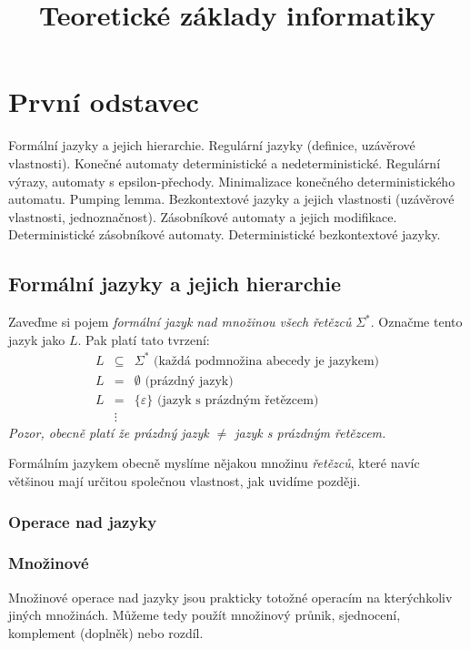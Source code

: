 \documentclass[10pt,a4paper]{article}
\title{Teoretické základy informatiky}
\theoremstyle{note}
\begin{document}
\maketitle

\newpage
\tableofcontents


\newpage

\section{První odstavec}

Formální jazyky a jejich hierarchie. Regulární jazyky (definice, uzávěrové vlastnosti). Konečné automaty deterministické
a nedeterministické. Regulární výrazy, automaty s epsilon-přechody. Minimalizace konečného deterministického
automatu. Pumping lemma. Bezkontextové jazyky a jejich vlastnosti (uzávěrové vlastnosti, jednoznačnost).
Zásobníkové automaty a jejich modifikace. Deterministické zásobníkové automaty. Deterministické
bezkontextové jazyky.

	\subsection{Formální jazyky a jejich hierarchie}

		Zaveďme si pojem \textit{formální jazyk nad množinou všech řetězců} $\Sigma^{*}$. Označme tento jazyk jako $L$. 				Pak platí tato tvrzení:
		\begin{eqnarray*}
			L &\subseteq& \Sigma^{*} \text{ (každá podmnožina abecedy je jazykem)} \\
			L &=& \emptyset \text{ (prázdný jazyk)} \\
			L &=& \lbrace \varepsilon \rbrace \text{ (jazyk s prázdným řetězcem)} \\
			&\vdots&
		\end{eqnarray*}
		\textit{Pozor, obecně platí že prázdný jazyk $\neq$ jazyk s prázdným řetězcem.}

		Formálním jazykem obecně myslíme nějakou množinu \textit{řetězců}, které navíc většinou mají určitou
		společnou vlastnost, jak uvidíme později.

		\subsubsection{Operace nad jazyky}

		\subsubsection{Množinové}
		Množinové operace nad jazyky jsou prakticky totožné operacím na kterýchkoliv jiných množinách.
		Můžeme tedy použít množinový průnik, sjednocení, komplement (doplněk) nebo rozdíl.
\end{document}
